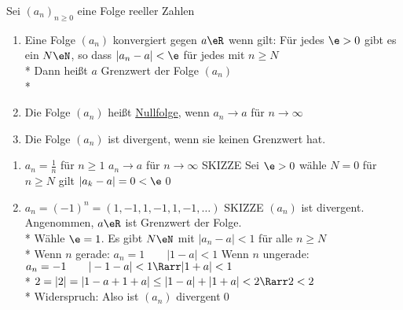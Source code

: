 Sei $(a_n)_{n\geq 0}$ eine Folge reeller Zahlen
\begin{enumerate}
\item{Eine Folge $(a_n)$ konvergiert gegen $a\eR$ wenn gilt: Für jedes $\e>0$ gibt es ein $N\eN$, so dass $|a_n-a|<\e$ für jedes \nN{} mit $n\geq N$\\*
Dann heißt $a$ Grenzwert der Folge $(a_n)$\\*
}
\item{Die Folge $(a_n)$ heißt \ul{Nullfolge}, wenn $a_n→a$ für $n→∞$}
\item{Die Folge $(a_n)$ ist divergent, wenn sie keinen Grenzwert hat.}
\end{enumerate}
%
\bsp
\begin{enumerate}
\item{$a_n=\frac{1}{n}$ für $n\geq 1$
 $a_n→a$ für $n→∞$ SKIZZE %
\bew
Sei $\e>0$ wähle $N=0$ für $n\geq N$ gilt $|a_k-a|=0<\e$\qed}
\item{$a_n=(-1)^n=(1,-1,1,-1,1,-1,…)$ SKIZZE %
 $(a_n)$ ist divergent. 
\bew
Angenommen, $a\eR$ ist Grenzwert der Folge.\\*
Wähle $\e=1$. Es gibt $N\eN$ mit $|a_n-a|<1$ für alle $n\geq N$\\*
Wenn $n$ gerade: $a_n=1\qquad |1-a|<1$
Wenn $n$ ungerade: $a_n=-1\qquad |-1-a|<1 \Rarr |1+a|<1$\\*
$2=|2|=|1-a+1+a|\leq |1-a|+|1+a|<2 \Rarr 2<2$\\*
Widerspruch: Also ist $(a_n)$ divergent\qed}
\end{enumerate}